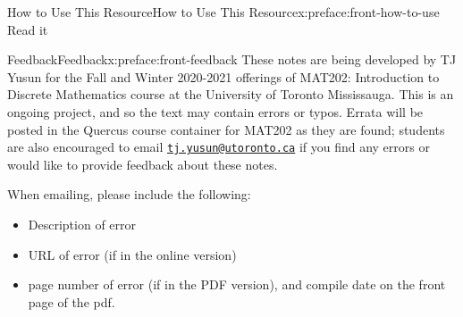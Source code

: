 \documentclass[oneside,10pt,]{book}
\newcommand{\mono}[1]{\texttt{#1}}
\numberwithin{equation}{section}
\begin{document}
%
%
\typeout{************************************************}
\typeout{************************************************}
%
\begin{preface}{How to Use This Resource}{}{How to Use This Resource}{}{}{x:preface:front-how-to-use}
Read it%
\end{preface}
%
%
\typeout{************************************************}
\typeout{************************************************}
%
\begin{preface}{Feedback}{}{Feedback}{}{}{x:preface:front-feedback}
These notes are being developed by TJ Yusun for the Fall and Winter 2020-2021 offerings of MAT202: Introduction to Discrete Mathematics course at the University of Toronto Mississauga. This is an ongoing project, and so the text may contain errors or typos. Errata will be posted in the Quercus course container for MAT202 as they are found; students are also encouraged to email \href{mailto:tj.yusun@utoronto.ca?subject=202notes-pretext}{\mono{tj.yusun@utoronto.ca}} if you find any errors or would like to provide feedback about these notes.%
\par
When emailing, please include the following:%
\begin{itemize}[label=\textbullet]
\item{}Description of error%
\item{}URL of error (if in the online version)%
\item{}page number of error (if in the PDF version), and compile date on the front page of the pdf.%
\end{itemize}
%
\end{preface}
\setcounter{tocdepth}{1}
\renewcommand*\contentsname{Contents}
\tableofcontents
\mainmatter
%
%
\typeout{************************************************}
\typeout{************************************************}
%
\end{document}
